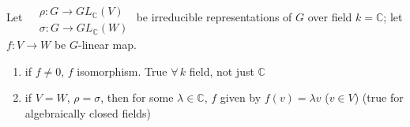 \begin{theorem}
	Let $\begin{aligned} & \quad \\
	& \rho : G \to GL_{\mathbb{C}}(V) \\
	& \sigma : G \to GL_{\mathbb{C}}(W) \end{aligned}$ be irreducible representations of $G$ over field $k= \mathbb{C}$; let $f:V \to W$ be $G$-linear map.  
	
	\begin{enumerate}
		\item[(a)] if $f\neq 0$, $f$ isomorphism.  True $\forall \, k$ field, not just $\mathbb{C}$
		\item[(b)] if $V=W$, $\rho = \sigma$, then for some $\lambda \in \mathbb{C}$, $f$ given by $f(v) = \lambda v$ ($v\in V$) (true for algebraically closed fields)
	\end{enumerate}
\end{theorem}

